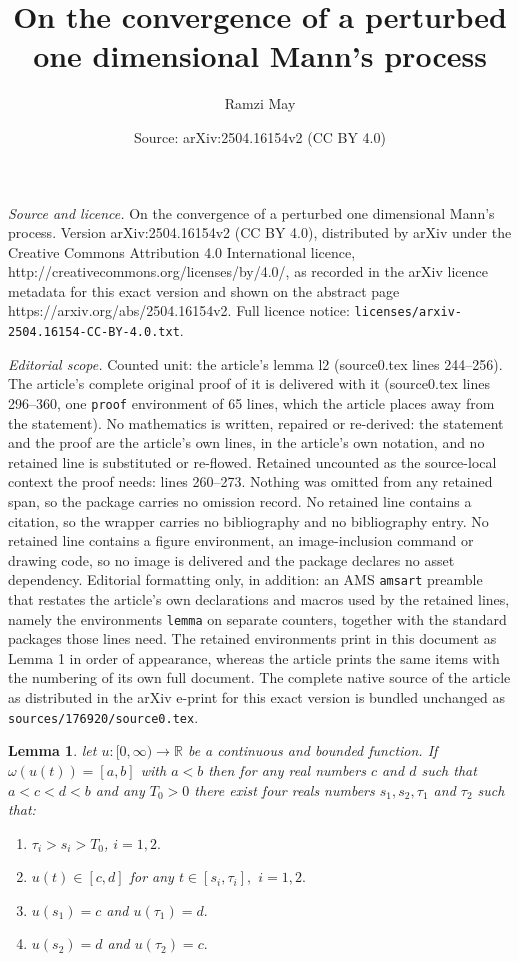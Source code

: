 \documentclass[10pt,a4paper]{amsart}
\title{On the convergence of a perturbed one dimensional Mann's process}
\author{Ramzi May}
\date{Source: arXiv:2504.16154v2 (CC BY 4.0)}
\newtheorem{lemma}{Lemma}
\begin{document}
\maketitle

\noindent\emph{Source and licence.} On the convergence of a perturbed one dimensional Mann's process. Version arXiv:2504.16154v2 (CC BY 4.0), distributed by arXiv under the Creative Commons Attribution 4.0 International licence, http://creativecommons.org/licenses/by/4.0/, as recorded in the arXiv licence metadata for this exact version and shown on the abstract page https://arxiv.org/abs/2504.16154v2. Full licence notice: \texttt{licenses/arxiv-2504.16154-CC-BY-4.0.txt}.\par\smallskip

\noindent\textit{Editorial scope.} Counted unit: the article's lemma l2 (source0.tex lines 244--256). The article's complete original proof of it is delivered with it (source0.tex lines 296--360, one \texttt{proof} environment of 65 lines, which the article places away from the statement). No mathematics is written, repaired or re-derived: the statement and the proof are the article's own lines, in the article's own notation, and no retained line is substituted or re-flowed.  Retained uncounted as the source-local context the proof needs: lines 260--273.  Nothing was omitted from any retained span, so the package carries no omission record.  No retained line contains a citation, so the wrapper carries no bibliography and no bibliography entry.  No retained line contains a figure environment, an image-inclusion command or drawing code, so no image is delivered and the package declares no asset dependency.  Editorial formatting only, in addition: an AMS \texttt{amsart} preamble that restates the article's own declarations and macros used by the retained lines, namely the environments \texttt{lemma} on separate counters, together with the standard packages those lines need.  The retained environments print in this document as Lemma 1 in order of appearance, whereas the article prints the same items with the numbering of its own full document.  The complete native source of the article as distributed in the arXiv e-print for this exact version is bundled unchanged as \texttt{sources/176920/source0.tex}.
\begin{lemma}
\label{l3}
let $u:[0,\infty )\to \mathbb{R}$ be a continuous and bounded
function. If $\omega (u(t))=[a,b]$ with $a<b$ then for any real numbers $c$
and $d$ such that $a<c<d<b$ and any $T_{0}>0$ there exist four reals numbers
$s_{1},s_{2},\tau _{1}$ and $\tau _{2}$ such that:
\begin{enumerate}
\item $\tau _{i}>s_{i}>T_{0}$, $i=1,2.$
\item $u(t)\in [c,d]$ for any $t\in [s_{i},\tau _{i}],$ $%
i=1,2.$
\item $u(s_{1})=c$ and $u(\tau _{1})=d.$
\item $u(s_{2})=d$ and $u(\tau _{2})=c.$
\end{enumerate}
\end{lemma}
\end{document}
